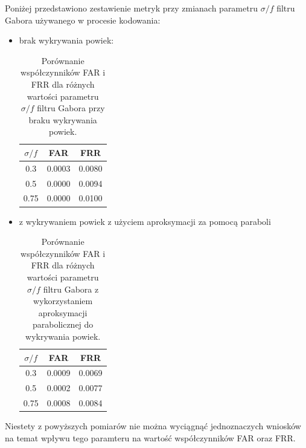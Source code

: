 \noindent
Poniżej przedstawiono zestawienie metryk przy zmianach parametru $\sigma/f$ filtru Gabora używanego
w procesie kodowania:

\begin{itemize}

  \item brak wykrywania powiek:

  \begin{table}[ht]
    \centering
    \begin{tabular}{c|c|c}
      \rowcolor{gray!20}
      $\mathit{\sigma/f}$ & FAR & FRR \\
      \hline\hline
      0.3 & 0.0003 & 0.0080 \\
      \hline
      0.5 & 0.0000 & 0.0094 \\
      \hline
      0.75 & 0.0000 & 0.0100 \\
    \end{tabular}
    \caption{Porównanie współczynników FAR i FRR dla różnych wartości parametru $\mathit{\sigma/f}$ filtru Gabora
    przy braku wykrywania powiek.}
  \end{table}

  \item z wykrywaniem powiek z użyciem aproksymacji za pomocą paraboli

  \begin{table}[ht]
    \centering
    \begin{tabular}{c|c|c}
      \rowcolor{gray!20}
      $\mathit{\sigma/f}$ & FAR & FRR \\
      \hline\hline
      0.3 & 0.0009 & 0.0069 \\
      \hline
      0.5 & 0.0002 & 0.0077 \\
      \hline
      0.75 & 0.0008 & 0.0084 \\
    \end{tabular}
    \caption{Porównanie współczynników FAR i FRR dla różnych wartości parametru $\mathit{\sigma/f}$ filtru Gabora
    z wykorzystaniem aproksymacji parabolicznej do wykrywania powiek.}
  \end{table}
\end{itemize}

Niestety z powyższych pomiarów nie można wyciągną\'c jednoznaczych wniosków na temat wpływu tego
paramteru na wartoś\'c współczynników FAR oraz FRR.
